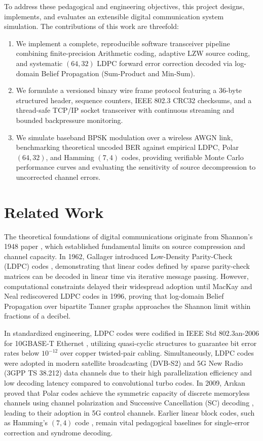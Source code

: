 \documentclass[conference]{IEEEtran}
\begin{document}
To address these pedagogical and engineering objectives, this project designs, implements, and evaluates an extensible digital communication system simulation. The contributions of this work are threefold:
\begin{enumerate}
    \item We implement a complete, reproducible software transceiver pipeline combining finite-precision Arithmetic coding, adaptive LZW source coding, and systematic $(64, 32)$ LDPC forward error correction decoded via log-domain Belief Propagation (Sum-Product and Min-Sum).
    \item We formulate a versioned binary wire frame protocol featuring a 36-byte structured header, sequence counters, IEEE 802.3 CRC32 checksums, and a thread-safe TCP/IP socket transceiver with continuous streaming and bounded backpressure monitoring.
    \item We simulate baseband BPSK modulation over a wireless AWGN link, benchmarking theoretical uncoded BER against empirical LDPC, Polar $(64, 32)$, and Hamming $(7, 4)$ codes, providing verifiable Monte Carlo performance curves and evaluating the sensitivity of source decompression to uncorrected channel errors.
\end{enumerate}

\section{Related Work}
The theoretical foundations of digital communications originate from Shannon's 1948 paper \cite{shannon1948}, which established fundamental limits on source compression and channel capacity. In 1962, Gallager introduced Low-Density Parity-Check (LDPC) codes \cite{gallager1962}, demonstrating that linear codes defined by sparse parity-check matrices can be decoded in linear time via iterative message passing. However, computational constraints delayed their widespread adoption until MacKay and Neal \cite{mackay1996} rediscovered LDPC codes in 1996, proving that log-domain Belief Propagation over bipartite Tanner graphs approaches the Shannon limit within fractions of a decibel.

In standardized engineering, LDPC codes were codified in IEEE Std 802.3an-2006 for 10GBASE-T Ethernet \cite{ieee8023an2006}, utilizing quasi-cyclic structures to guarantee bit error rates below $10^{-12}$ over copper twisted-pair cabling. Simultaneously, LDPC codes were adopted in modern satellite broadcasting (DVB-S2) and 5G New Radio (3GPP TS 38.212) data channels due to their high parallelization efficiency and low decoding latency compared to convolutional turbo codes. In 2009, Ar{\i}kan proved that Polar codes achieve the symmetric capacity of discrete memoryless channels using channel polarization and Successive Cancellation (SC) decoding \cite{arikan2009}, leading to their adoption in 5G control channels. Earlier linear block codes, such as Hamming's $(7, 4)$ code \cite{hamming1950}, remain vital pedagogical baselines for single-error correction and syndrome decoding.
\end{document}
